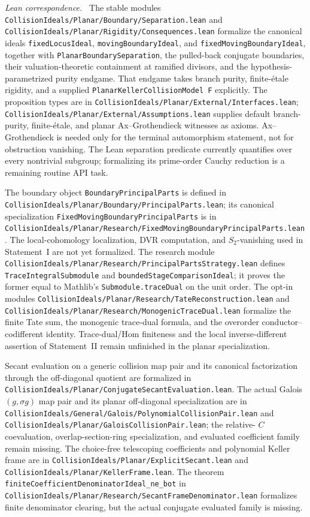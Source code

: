 \documentclass[11pt]{article}
\theoremstyle{remark}
\theoremstyle{definition}
\newcommand{\leanpath}[1]{\texttt{\nolinkurl{#1}}}
\newenvironment{leanfiles}
  {\par\medskip\begingroup\footnotesize\raggedright\noindent
   \textit{Lean correspondence.}\ }
  {\par\endgroup\medskip}
\begin{document}
\begin{leanfiles}
The stable modules
\leanpath{CollisionIdeals/Planar/Boundary/Separation.lean} and
\leanpath{CollisionIdeals/Planar/Rigidity/Consequences.lean} formalize the
canonical ideals \leanpath{fixedLocusIdeal},
\leanpath{movingBoundaryIdeal}, and \leanpath{fixedMovingBoundaryIdeal},
together with \leanpath{PlanarBoundarySeparation}, the pulled-back
conjugate boundaries, their valuation-theoretic containment at ramified
divisors, and the hypothesis-parametrized purity endgame.  That endgame
takes branch purity, finite-\'etale rigidity, and a supplied
\leanpath{PlanarKellerCollisionModel F} explicitly.  The proposition types
are in \leanpath{CollisionIdeals/Planar/External/Interfaces.lean};
\leanpath{CollisionIdeals/Planar/External/Assumptions.lean} supplies default
branch-purity, finite-\'etale, and planar Ax--Grothendieck witnesses as
axioms.  Ax--Grothendieck is needed only for the terminal automorphism
statement, not for obstruction vanishing.  The Lean separation predicate
currently quantifies over every nontrivial subgroup; formalizing its
prime-order Cauchy reduction is a remaining routine API task.

The boundary object \leanpath{BoundaryPrincipalParts} is defined in
\leanpath{CollisionIdeals/Planar/Boundary/PrincipalParts.lean}; its canonical
specialization \leanpath{FixedMovingBoundaryPrincipalParts} is in
\leanpath{CollisionIdeals/Planar/Research/FixedMovingBoundaryPrincipalParts.lean}.
The local-cohomology localization, DVR computation, and \(S_2\)-vanishing
used in Statement~I are not yet formalized.  The research module
\leanpath{CollisionIdeals/Planar/Research/PrincipalPartsStrategy.lean}
defines \leanpath{TraceIntegralSubmodule} and
\leanpath{boundedStageComparisonIdeal}; it proves the former equal to
Mathlib's \leanpath{Submodule.traceDual} on the unit order.  The opt-in
modules \leanpath{CollisionIdeals/Planar/Research/TateReconstruction.lean}
and \leanpath{CollisionIdeals/Planar/Research/MonogenicTraceDual.lean}
formalize the finite Tate sum, the monogenic trace-dual formula, and the
overorder conductor--codifferent identity.  Trace-dual/Hom finiteness and
the local inverse-different assertion of Statement~II remain unfinished in
the planar specialization.

Secant evaluation on a generic collision map pair and its canonical
factorization through the off-diagonal quotient are formalized in
\leanpath{CollisionIdeals/Planar/ConjugateSecantEvaluation.lean}.  The actual
Galois \((g,\sigma g)\) map pair and its planar off-diagonal specialization
are in
\leanpath{CollisionIdeals/General/Galois/PolynomialCollisionPair.lean} and
\leanpath{CollisionIdeals/Planar/GaloisCollisionPair.lean}; the relative-
\(C\) coevaluation, overlap-section-ring specialization, and evaluated
coefficient family remain missing.  The choice-free telescoping
coefficients and polynomial Keller frame are in
\leanpath{CollisionIdeals/Planar/ExplicitSecant.lean} and
\leanpath{CollisionIdeals/Planar/KellerFrame.lean}.  The theorem
\leanpath{finiteCoefficientDenominatorIdeal_ne_bot} in
\leanpath{CollisionIdeals/Planar/Research/SecantFrameDenominator.lean}
formalizes finite denominator clearing, but the actual conjugate evaluated
family is missing.


\end{leanfiles}
\end{document}
